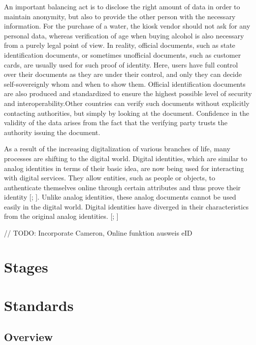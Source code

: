     An important balancing act is to disclose the right amount of data in order to maintain anonymity, but also to provide the other person with the necessary information. For the purchase of a water, the kiosk vendor should not ask for any personal data, whereas verification of age when buying alcohol is also necessary from a purely legal point of view. In reality, official documents, such as state identification documents, or sometimes unofficial documents, such as customer cards, are usually used for such proof of identity. Here, users have full control over their documents as they are under their control, and only they can decide self-sovereignly whom and when to show them. Official identification documents are also produced and standardized to ensure the highest possible level of security and interoperability.Other countries can verify such documents without explicitly contacting authorities, but simply by looking at the document.  Confidence in the validity of the data arises from the fact that the verifying party trusts the authority issuing the document. \cite[p. 6]{struker_grundlagen_2021}

    As a result of the increasing digitalization of various branches of life, many processes are shifting to the digital world. Digital identities, which are similar to analog identities in terms of their basic idea, are now being used for interacting with digital services. They allow entities, such as people or objects, to authenticate themselves online through certain attributes and thus prove their identity [\citealp[p. 103]{meinel_blockchain_2020}; \citealp{bundesdruckerei_so_2020}]. Unlike analog identities, these analog documents cannot be used easily in the digital world. Digital identities have diverged in their characteristics from the original analog identities. [\citealp[p. 10]{struker_grundlagen_2021}; \citealp[p. 2]{ehrlich_self-sovereign_2021}] 
    
    // TODO: Incorporate Cameron, Online funktion ausweis eID
        
	\section{Stages}
	\section{Standards}
	    \subsection{Overview}
